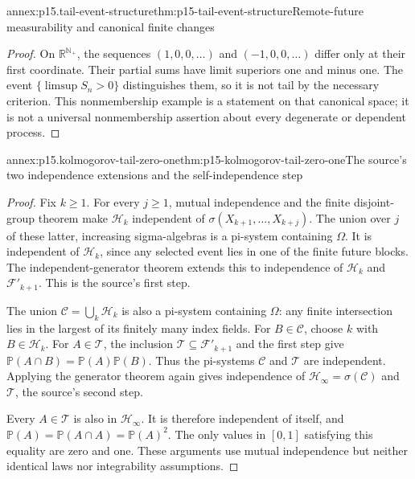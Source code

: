 \begin{annexitem}{annex:p15.tail-event-structure}{thm:p15-tail-event-structure}{Remote-future measurability and canonical finite changes}
\begin{proof}
On \(\mathbb R^{\mathbb N_+}\), the sequences
\((1,0,0,\ldots)\) and \((-1,0,0,\ldots)\) differ only
at their first coordinate. Their partial sums have limit superiors
one and minus one. The event \(\{\limsup S_n>0\}\) distinguishes
them, so it is not tail by the necessary criterion. This nonmembership
example is a statement on that canonical space; it is not a universal
nonmembership assertion about every degenerate or dependent process.
\end{proof}
\end{annexitem}

\begin{annexitem}{annex:p15.kolmogorov-tail-zero-one}{thm:p15-kolmogorov-tail-zero-one}{The source's two independence extensions and the self-independence step}
\begin{proof}
Fix \(k\geq1\). For every \(j\geq1\), mutual independence
and the finite disjoint-group theorem make \(\mathcal H_k\)
independent of \(\sigma(X_{k+1},\ldots,X_{k+j})\).
The union over \(j\) of these latter, increasing sigma-algebras
is a pi-system containing \(\Omega\). It is independent of
\(\mathcal H_k\), since any selected event lies in one of
the finite future blocks. The independent-generator theorem
extends this to independence of \(\mathcal H_k\) and
\(\mathcal F'_{k+1}\). This is the source's first step.

The union \(\mathcal C=\bigcup_k\mathcal H_k\) is also a
pi-system containing \(\Omega\): any finite intersection
lies in the largest of its finitely many index fields.
For \(B\in\mathcal C\), choose \(k\) with \(B\in\mathcal H_k\).
For \(A\in\mathcal T\), the inclusion
\(\mathcal T\subseteq\mathcal F'_{k+1}\) and the first step
give \(\mathbb P(A\cap B)=\mathbb P(A)\mathbb P(B)\).
Thus the pi-systems \(\mathcal C\) and \(\mathcal T\)
are independent. Applying the generator theorem again gives
independence of \(\mathcal H_\infty=\sigma(\mathcal C)\)
and \(\mathcal T\), the source's second step.

Every \(A\in\mathcal T\) is also in \(\mathcal H_\infty\).
It is therefore independent of itself, and
\(\mathbb P(A)=\mathbb P(A\cap A)=\mathbb P(A)^2\).
The only values in \([0,1]\) satisfying this equality are
zero and one. These arguments use mutual independence but
neither identical laws nor integrability assumptions.
\end{proof}
\end{annexitem}

